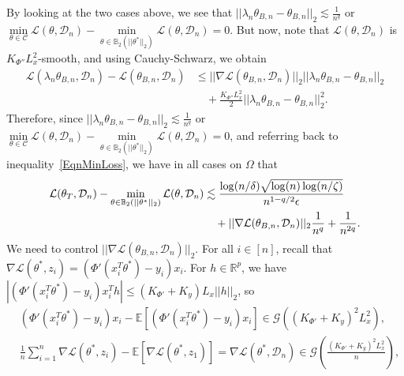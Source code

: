 \documentclass{article}
\begin{document}
By looking at the two cases above, we see that $||\lambda_n\theta_{B, n} - \theta_{B, n}||_2 \lesssim \frac{1}{n^q}$ or $\mathop{\min}\limits_{\theta \in \mathcal{C}}\mathcal{L}(\theta, \mathcal{D}_n) - \mathop{\min}\limits_{\theta \in \mathbb{B}_2(||\theta^*||_2)}\mathcal{L}(\theta, \mathcal{D}_n) = 0$. But now, note that $\mathcal{L}(\theta, \mathcal{D}_n)$ is $K_{\Phi''}L_x^2$-smooth, and using Cauchy-Schwarz, we obtain
\begin{align*}
\mathcal{L}(\lambda_n\theta_{B, n}, \mathcal{D}_n) - \mathcal{L}(\theta_{B, n}, \mathcal{D}_n) &\leq ||\nabla \mathcal{L}(\theta_{B, n}, \mathcal{D}_n)||_2||\lambda_n\theta_{B, n} - \theta_{B, n}||_2\\
& \quad + \frac{K_{\Phi''}L_x^2}{2}||\lambda_n\theta_{B, n} - \theta_{B, n}||_2^2.
\end{align*}
Therefore, since $||\lambda_n\theta_{B, n} - \theta_{B, n}||_2 \lesssim \frac{1}{n^q}$ or $\mathop{\min}\limits_{\theta \in \mathcal{C}}\mathcal{L}(\theta, \mathcal{D}_n) - \mathop{\min}\limits_{\theta \in \mathbb{B}_2(||\theta^*||_2)}\mathcal{L}(\theta, \mathcal{D}_n) = 0$, and referring back to inequality~\eqref{EqnMinLoss}, we have in all cases on $\Omega$ that
\begin{align}
\label{EqnLq}
\mathcal{L}(\theta_T, \mathcal{D}_n) - \mathop{\min}\limits_{\theta \in \mathbb{B}_2(||\theta^*||_2)}\mathcal{L}(\theta, \mathcal{D}_n) &\lesssim \frac{\log(n/\delta)\sqrt{\log(n)\log(n/\zeta)}}{n^{1 - q/2}\epsilon}\notag\\ 
& \quad + ||\nabla \mathcal{L}(\theta_{B, n}, \mathcal{D}_n)||_2\frac{1}{n^q} + \frac{1}{n^{2q}}.
\end{align}
We need to control $||\nabla \mathcal{L}(\theta_{B, n}, \mathcal{D}_n)||_2$. For all $i \in [n]$, recall that $\nabla \mathcal{L}(\theta^*, z_i) = (\Phi'(x_i^T\theta^*) - y_i)x_i$. For $h \in \mathbb{R}^p$, we have $|(\Phi'(x_i^T\theta^*) - y_i)x_i^Th| \leq (K_{\Phi'} + K_y)L_x||h||_2$, so
\begin{align*}
& (\Phi'(x_i^T\theta^*) - y_i)x_i - \mathbb{E}[(\Phi'(x_i^T\theta^*) - y_i)x_i] \in \mathcal{G}\left((K_{\Phi'} + K_y)^2L_x^2\right), \\
%
& \frac{1}{n}\sum_{i = 1}^n\nabla \mathcal{L}(\theta^*, z_i) - \mathbb{E}[\nabla \mathcal{L}(\theta^*, z_1)] = \nabla \mathcal{L}(\theta^*, \mathcal{D}_n) \in \mathcal{G}\left(\frac{(K_{\Phi'} + K_y)^2L_x^2}{n}\right),
\end{align*}
\end{document}

